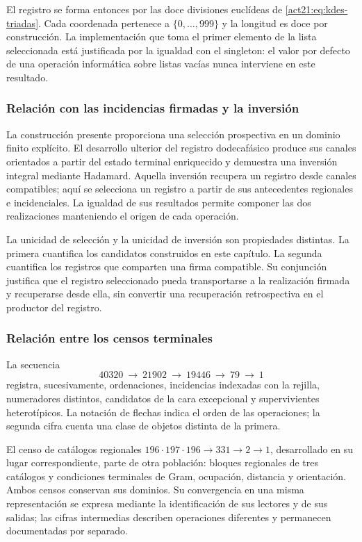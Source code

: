El registro se forma entonces por las doce divisiones euclídeas de
\eqref{act21:eq:kdes-triadas}. Cada coordenada pertenece a
$\{0,\ldots,999\}$ y la longitud es doce por construcción. La
implementación que toma el primer elemento de la lista seleccionada
está justificada por la igualdad con el singleton: el valor por defecto
de una operación informática sobre listas vacías nunca interviene en
este resultado.

\subsubsection{Relación con las incidencias firmadas y la inversión}

La construcción presente proporciona una selección prospectiva en un
dominio finito explícito. El desarrollo ulterior del registro
dodecafásico produce sus canales orientados a partir del estado
terminal enriquecido y demuestra una inversión integral mediante
Hadamard. Aquella inversión recupera un registro desde canales
compatibles; aquí se selecciona un registro a partir de sus
antecedentes regionales e incidenciales. La igualdad de sus resultados
permite componer las dos realizaciones manteniendo el origen de cada
operación.

La unicidad de selección y la unicidad de inversión son propiedades
distintas. La primera cuantifica los candidatos construidos en este
capítulo. La segunda cuantifica los registros que comparten una firma
compatible. Su conjunción justifica que el registro seleccionado pueda
transportarse a la realización firmada y recuperarse desde ella, sin
convertir una recuperación retrospectiva en el productor del registro.

\subsubsection{Relación entre los censos terminales}
\label{act21:sec:relacion-censos}

La secuencia
\[
 40320\ \longrightarrow\ 21902\ \longrightarrow\ 19446
 \ \longrightarrow\ 79\ \longrightarrow\ 1
\]
registra, sucesivamente, ordenaciones, incidencias indexadas con la
rejilla, numeradores distintos, candidatos de la cara excepcional y
supervivientes heterotípicos. La notación de flechas indica el orden de
las operaciones; la segunda cifra cuenta una clase de objetos
distinta de la primera.

El censo de catálogos regionales
$196\cdot197\cdot196\longrightarrow331\longrightarrow2
\longrightarrow1$, desarrollado en su lugar correspondiente, parte de
otra población: bloques regionales de tres catálogos y condiciones
terminales de Gram, ocupación, distancia y orientación. Ambos censos
conservan sus dominios. Su convergencia en una misma representación se
expresa mediante la identificación de sus lectores y de sus salidas;
las cifras intermedias describen operaciones diferentes y permanecen
documentadas por separado.

